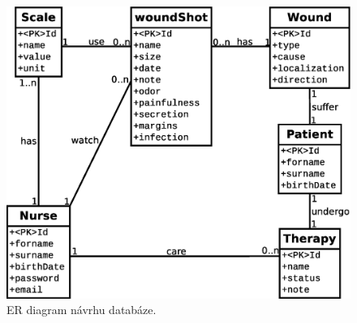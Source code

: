 \begin{figure}[h]
      \centering
      \includegraphics[scale=0.50]{fig/erd.eps}
      \caption{ER diagram návrhu databáze.}
      \label{fig:erd}
\end{figure}

